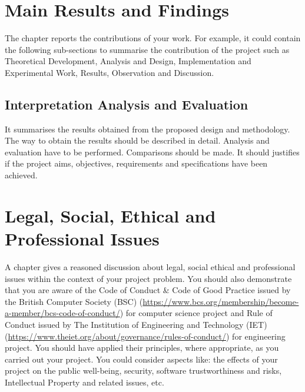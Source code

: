 \section{Main Results and Findings}
The chapter reports the contributions of your work.  For example, it could contain the following sub-sections to summarise the contribution of the project such as Theoretical Development, Analysis and Design, Implementation and Experimental Work, Results, Observation and Discussion.



\subsection{Interpretation Analysis and Evaluation}
	It summarises the results obtained from the proposed design and methodology. The way to obtain the results should be described in detail. Analysis and evaluation have to be performed. Comparisons should be made. It should justifies if the project aims, objectives, requirements and specifications have been achieved.

\section{Legal, Social, Ethical and Professional Issues}
	A chapter gives a reasoned discussion about legal, social ethical and professional issues within the context of your project problem. You should also demonstrate that you are aware of the Code of Conduct \& Code of Good Practice issued by the British Computer Society (BSC) (\url{https://www.bcs.org/membership/become-a-member/bcs-code-of-conduct/}) for computer science project and Rule of Conduct issued by The Institution of Engineering and Technology (IET) (\url{https://www.theiet.org/about/governance/rules-of-conduct/}) for engineering project.  You should have applied their principles, where appropriate, as you carried out your project. You could consider aspects like: the effects of your project on the public well-being, security, software trustworthiness and risks, Intellectual Property and related issues, etc.


